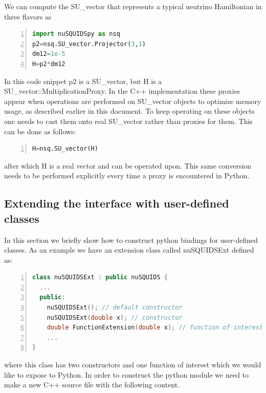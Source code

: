 \documentclass[3p,12pt]{elsarticle}
\newcommand{\ttf}{\ttfamily}
\begin{document}
We can compute the {\ttf SU\_vector} that represents a typical neutrino Hamiltonian 
in three flavors as
\begin{lstlisting}[language=Python, frame=leftline, numbers=left, breaklines=true]
import nuSQUIDSpy as nsq
p2=nsq.SU_vector.Projector(3,1)
dm12=1e-5
H=p2*dm12
\end{lstlisting}
In this code snippet {\ttf p2} is a {\ttf SU\_vector}, but {\ttf H} is a {\ttf SU\_vector::MultiplicationProxy}.
In the {\ttf C++} implementation these proxies appear when operations are performed on {\ttf SU\_vector} objects
to optimize memory usage, as described earlier in this document. To keep operating on these objects one needs to 
cast them onto real {\ttf SU\_vector} rather than proxies for them. This can be done as follows:
\begin{lstlisting}[language=Python, frame=leftline, numbers=left, breaklines=true]
H=nsq.SU_vector(H)
\end{lstlisting}
after which {\ttf H} is a real vector and can be operated upon. This same conversion needs to be performed explicitly
every time a proxy is encountered in {\ttf Python}.

\subsection{Extending the interface with user-defined classes~\label{sec:python_extensions}}

In this section we briefly show how to construct python bindings for user-defined classes. As an example
we have an extension class called {\ttf nuSQUIDSExt} defined as:

\begin{lstlisting}[language=C++, frame=leftline, numbers=left, breaklines=true]
class nuSQUIDSExt : public nuSQUIDS {
  ...
  public:
    nuSQUIDSExt(); // default constructor
    nuSQUIDSExt(double x); // constructor
    double FunctionExtension(double x); // function of interest
    ...
}
\end{lstlisting}
where this class has two constructors and one function of interest which we would like to expose to {\ttf Python}.
In order to construct the python module we need to make a new C++ source file with the following content.
\end{document}
